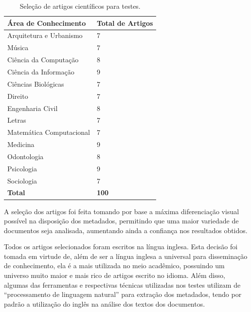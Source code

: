 \begin{table}
    \caption{Seleção de artigos científicos para testes.}
    \begin{center}
        \begin{tabular}{|l|l|}
            \hline
            \textbf{Área de Conhecimento} & \textbf{Total de Artigos} \\ 
            \hline
            Arquitetura e Urbanismo & 7 \\ 
            Música & 7 \\ 
            Ciência da Computação & 8 \\
            Ciência da Informação & 9 \\
            Ciências Biológicas & 7 \\
            Direito & 7 \\
            Engenharia Civil & 8 \\
            Letras & 7 \\
            Matemática Computacional & 7 \\
            Medicina & 9 \\ 
            Odontologia & 8 \\ 
            Psicologia & 9 \\
            Sociologia & 7 \\   
            \hline
            \textbf{Total} & \textbf{100} \\
            \hline 
        \end{tabular}
    \end{center}
    \label{tab:papers-list}
\end{table}

A seleção dos artigos foi feita tomando por base a máxima diferenciação visual possível na disposição dos metadados, permitindo que uma maior variedade de documentos seja analisada, aumentando ainda a confiança nos resultados obtidos.


Todos os artigos selecionados foram escritos na língua inglesa. Esta decisão foi tomada em virtude de, além de ser a língua inglesa a universal para disseminação de conhecimento, ela é a mais utilizada no meio acadêmico, possuindo um universo muito maior e mais rico de artigos escrito no idioma. Além disso, algumas das ferramentas e respectivas técnicas utilizadas nos testes utilizam de ``processamento de linguagem natural'' para extração dos metadados, tendo por padrão a utilização do inglês na análise dos textos dos documentos.

